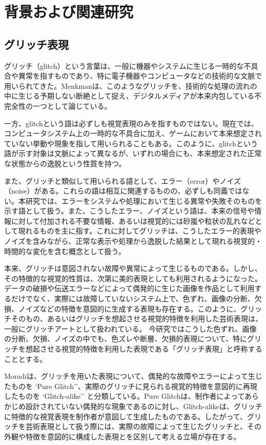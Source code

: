 \chapter{背景および関連研究}

\section{グリッチ表現}

グリッチ（glitch）という言葉は、一般に機器やシステムに生じる一時的な不具合や異常を指すものであり、特に電子機器やコンピュータなどの技術的な文脈で用いられてきた。Menkmanは、このようなグリッチを、技術的な処理の流れの中に生じる予期しない断絶として捉え、デジタルメディアが本来内包している不完全性の一つとして論じている\cite{menkman2011momentum}。

一方、glitchという語は必ずしも視覚表現のみを指すものではない。現在では、コンピュータシステム上の一時的な不具合に加え、ゲームにおいて本来想定されていない挙動や現象を指して用いられることもある。このように、glitchという語が示す対象は文脈によって異なるが、いずれの場合にも、本来想定された正常な状態からの逸脱という性質を持つ。

また、グリッチと類似して用いられる語として、エラー（error）やノイズ（noise）がある。これらの語は相互に関連するものの、必ずしも同義ではない。本研究では、エラーをシステムや処理において生じる異常や失敗そのものを示す語として扱う。また、こうしたエラー、ノイズという語は、本来の信号や情報に対して付加される不要な情報、あるいは視覚的には砂嵐や粒状の乱れなどとして現れるものを主に指す。これに対してグリッチは、こうしたエラー的表現やノイズを含みながら、正常な表示や処理から逸脱した結果として現れる視覚的・時間的な変化を含む概念として扱う。

本来、グリッチは意図されない故障や異常によって生じるものである。しかし、その特徴的な視覚的性質は、次第に美的表現としても利用されるようになった。データの破損や伝送エラーなどによって偶発的に生じた画像を作品として利用するだけでなく、実際には故障していないシステム上で、色ずれ、画像の分断、欠損、ノイズなどの特徴を意図的に生成する表現も存在する。このように、グリッチそのもの、あるいはグリッチを想起させる視覚的特徴を利用した芸術表現は、一般にグリッチアートとして扱われている。
今研究ではこうした色ずれ、画像の分断、欠損、ノイズの中でも、色ズレや断層、欠損的表現について、特にグリッチを想起させる視覚的特徴を利用した表現である「グリッチ表現」と呼称することとする。

Moradiは、グリッチを用いた表現について、偶発的な故障やエラーによって生じたものを `Pure Glitch''、実際のグリッチに見られる視覚的特徴を意図的に再現したものを `Glitch-alike'' と分類している\cite{moradi2004glitch}。Pure Glitchは、制作者によってあらかじめ設計されていない偶発的な現象であるのに対し、Glitch-alikeは、グリッチに特徴的な視覚表現を制作者が意図して生成したものである。したがって、グリッチを芸術表現として扱う際には、実際の故障によって生じたグリッチと、その外観や特徴を意図的に構成した表現とを区別して考える立場が存在する。

